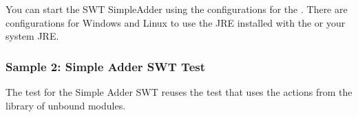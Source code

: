 You can start the SWT SimpleAdder using the configurations for the  \gdaut{}. There are configurations for Windows and Linux to use the JRE installed with the \ite{} or your system JRE.

\subsubsection{Sample 2: Simple Adder SWT Test}
The test for the Simple Adder SWT reuses the test that uses the actions from the library of unbound modules.
